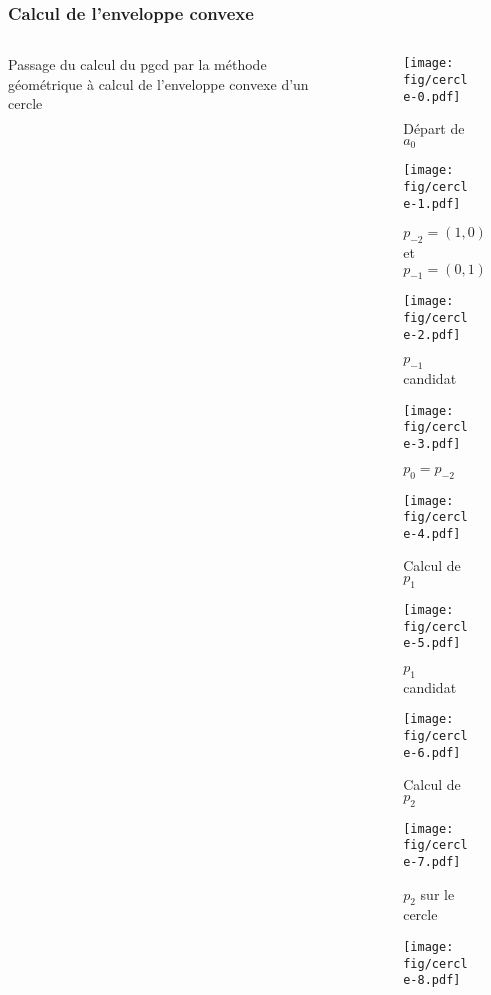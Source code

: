 \documentclass{beamer}
\begin{document}
\begin{frame}
\frametitle{Calcul de l'enveloppe convexe}
\begin{columns}[t]
  \begin{column}{5cm}
  
  \begin{block}{}
    Passage du calcul du pgcd par la méthode géométrique à calcul de l'enveloppe convexe d'un cercle
  \end{block}
    
  \end{column}

  \begin{column}{4cm}
{
  \begin{figure}[h!]
    \centering
    \texttt{[image: fig/cercle-0.pdf]}
    \caption{Départ de $a_{0}$}
\end{figure}
}
{
  \begin{figure}[h!]
    \centering
    \texttt{[image: fig/cercle-1.pdf]}
    \caption{$p_{-2}=(1,0)$ et $p_{-1}=(0,1)$}
\end{figure}
}
{
  \begin{figure}[h!]
    \centering
    \texttt{[image: fig/cercle-2.pdf]}
    \caption{$p_{-1}$ candidat}
\end{figure}
}
{
  \begin{figure}[h!]
    \centering
    \texttt{[image: fig/cercle-3.pdf]}
    \caption{$p_{0} = p_{-2}$}
\end{figure}
}
{
  \begin{figure}[h!]
    \centering
    \texttt{[image: fig/cercle-4.pdf]}
    \caption{Calcul de $p_{1}$}
\end{figure}
}
{
  \begin{figure}[h!]
    \centering
    \texttt{[image: fig/cercle-5.pdf]}
    \caption{$p_{1}$ candidat}
\end{figure}
}
{
  \begin{figure}[h!]
    \centering
    \texttt{[image: fig/cercle-6.pdf]}
    \caption{Calcul de $p_{2}$}
\end{figure}
}
{
  \begin{figure}[h!]
    \centering
    \texttt{[image: fig/cercle-7.pdf]}
    \caption{$p_{2}$ sur le cercle}
\end{figure}
}
{
  \begin{figure}[h!]
    \centering
    \texttt{[image: fig/cercle-8.pdf]}

\end{figure}}
\end{column}
\end{columns}
\end{frame}
\end{document}
